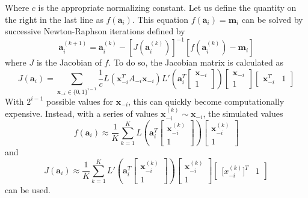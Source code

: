 \documentclass[11pt]{article}
\theoremstyle{definition}
\begin{document}
            Where $c$ is the appropriate normalizing constant. Let us define the quantity on the right in the last line as $f(\mathbf a_i)$. This equation $f(\mathbf a_i)=\mathbf{m}_i$ can be solved by successive Newton-Raphson iterations defined by 
            \[\mathbf a_i^{(k+1)} = \mathbf a_i^{(k)} - \left[J\left(\mathbf a_i^{(k)}\right) \right]^{-1}\left[f\left(\mathbf a_i^{(k)}\right)-\mathbf m_i\right] \]
            where $J$ is the Jacobian of $f$. To do so, the Jacobian matrix is calculated as 
        \[ J\left( \mathbf a_i\right) = \sum_{\mathbf x_{-i} \in \{0,1\}^{i-1}} \frac{1}{c}L \left(\mathbf x_{-i}^TA_{-i}\mathbf x_{-i}\right) L'\left(\mathbf{a}_i^T\left[\begin{array}{c} \mathbf x_{-i} \\ 1 \end{array}\right]\right)\left[\begin{array}{c} \mathbf x_{-i} \\ 1 \end{array}\right]\left[\begin{array}{cc} \mathbf x_{-i}^T & 1 \end{array}\right] \]
            With $2^{i-1}$ possible values for $\mathbf x_{-i}$, this can quickly become computationally expensive. Instead, with a series of values $\mathbf x_{-i}^{(k)}\sim \mathbf x_{-i}$, the simulated values 
            \[f\left(\mathbf a_i\right) \approx \frac{1}{K}\sum_{k=1}^K L\left(\mathbf{a}_i^T\left[\begin{array}{c} \mathbf x_{-i}^{(k)} \\ 1 \end{array}\right]\right)\left[\begin{array}{c} \mathbf x_{-i}^{(k)} \\ 1 \end{array}\right] \]
            and
            \[J\left( \mathbf a_i\right) \approx \frac{1}{K}\sum_{k=1}^K L'\left(\mathbf{a}_i^T\left[\begin{array}{c} \mathbf x_{-i}^{(k)} \\ 1 \end{array}\right]\right)\left[\begin{array}{c} \mathbf x_{-i}^{(k)} \\ 1 \end{array}\right]\left[\begin{array}{cc} \mathbf [x_{-i}^{(k)}]^T & 1 \end{array}\right] \]
            can be used. \par
\end{document}
